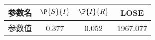 \begin{tabular}{cccc}
\hline
参数名&$\P{S}{I}$&$\P{I}{R}$&LOSE\\
\hline
参数值&0.377&0.052&1967.077\\
\hline
\end{tabular}